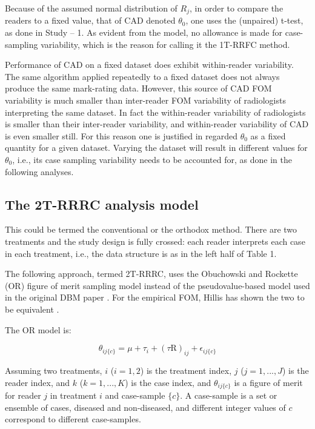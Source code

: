 \documentclass[
]{book}
\begin{document}
Because of the assumed normal distribution of \(R_j\), in order to compare the readers to a fixed value, that of CAD denoted \(\theta_0\), one uses the (unpaired) t-test, as done in Study -- 1. As evident from the model, no allowance is made for case-sampling variability, which is the reason for calling it the 1T-RRFC method.

Performance of CAD on a fixed dataset does exhibit within-reader variability. The same algorithm applied repeatedly to a fixed dataset does not always produce the same mark-rating data. However, this source of CAD FOM variability is much smaller than inter-reader FOM variability of radiologists interpreting the same dataset. In fact the within-reader variability of radiologists is smaller than their inter-reader variability, and within-reader variability of CAD is even smaller still. For this reason one is justified in regarded \(\theta_0\) as a fixed quantity for a given dataset. Varying the dataset will result in different values for \(\theta_0\), i.e., its case sampling variability needs to be accounted for, as done in the following analyses.

\hypertarget{standalone-cad-radiologists-2TRRRC-anlaysis}{%
\subsection{The 2T-RRRC analysis model}\label{standalone-cad-radiologists-2TRRRC-anlaysis}}

This could be termed the conventional or the orthodox method. There are two treatments and the study design is fully crossed: each reader interprets each case in each treatment, i.e., the data structure is as in the left half of Table 1.

The following approach, termed 2T-RRRC, uses the Obuchowski and Rockette (OR) figure of merit sampling model \citep{obuchowski1995hypothesis} instead of the pseudovalue-based model used in the original DBM paper \citep{dorfman1992receiver}. For the empirical FOM, Hillis has shown the two to be equivalent \citep{hillis2005comparison}.

The OR model is:

\begin{equation}
\theta_{ij\{c\}}=\mu+\tau_i+\left ( \tau \text{R} \right )_{ij}+\epsilon_{ij\{c\}}
\label{eq:standalone-cad-model-2t-rrrc}
\end{equation}

Assuming two treatments, \(i\) (\(i = 1, 2\)) is the treatment index, \(j\) (\(j = 1, ..., J\)) is the reader index, and \(k\) (\(k = 1, ..., K\)) is the case index, and \(\theta_{ij\{c\}}\) is a figure of merit for reader \(j\) in treatment \(i\) and case-sample \(\{c\}\). A case-sample is a set or ensemble of cases, diseased and non-diseased, and different integer values of \(c\) correspond to different case-samples.
\end{document}
